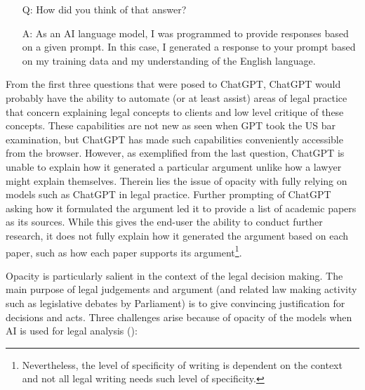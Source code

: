 \begin{enumerate}
\begin{itemize}
    \item[Q:] How did you think of that answer?
    \item[A:] As an AI language model, I was programmed to provide responses based on a given prompt. In this case, I generated a response to your prompt based on my training data and my understanding of the English language.
  \end{itemize} 
\end{enumerate}

From the first three questions that were posed to ChatGPT, ChatGPT would probably have the ability to automate (or at least assist) areas of legal practice that concern explaining legal concepts to clients and low level critique of these concepts. These capabilities are not new as seen when GPT took the US bar examination, but ChatGPT has made such capabilities conveniently accessible from the browser. However, as exemplified from the last question, ChatGPT is unable to explain how it generated a particular argument unlike how a lawyer might explain themselves. Therein lies the issue of opacity with fully relying on models such as ChatGPT in legal practice. Further prompting of ChatGPT asking how it formulated the argument led it to provide a list of academic papers as its sources. While this gives the end-user the ability to conduct further research, it does not fully explain how it generated the argument based on each paper, such as how each paper supports its argument\footnote{Nevertheless, the level of specificity of writing is dependent on the context and not all legal writing needs such level of specificity.}.

Opacity is particularly salient in the context of the legal decision making. The main purpose of legal judgements and argument (and related law making activity such as legislative debates by Parliament) is to give convincing justification for decisions and acts. Three challenges arise because of opacity of the models when AI is used for legal analysis (\cite{chesterman2021_opacity}): 

